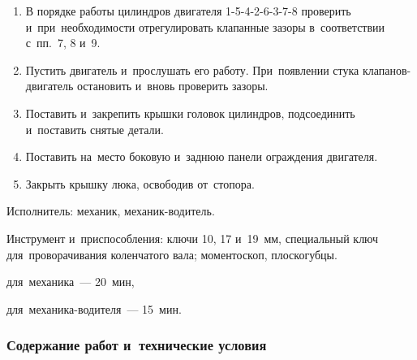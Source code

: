 \begin{enumerate}
    \textit{Примечания:} 
    \begin{itemize}
        \item \textit{Щуп толщиной 0,25~мм должен входить в~зазор с~легким нажимом, толщиной 0,3~мм~--- с~усилием.}
        \item \textit{Регулировать на~холодном двигателе по~истечении 30~мин после его остановки.}
    \end{itemize}
    \item В порядке работы цилиндров двигателя 1-5-4-2-6-3-7-8 проверить и~при~необходимости отрегулировать клапанные зазоры в~соответствии с~пп.~7, 8 и~9. 
    \item Пустить двигатель и~прослушать его работу. При~появлении стука клапанов-двигатель остановить и~вновь проверить зазоры. 
    \item Поставить и~закрепить крышки головок цилиндров, подсоединить и~поставить снятые детали. 
    \item Поставить на~место боковую и~заднюю панели ограждения двигателя. 
    \item Закрыть крышку люка, освободив от~стопора. 
\end{enumerate}

\noindent
Исполнитель: механик, механик-водитель. 

\noindent
Инструмент и~приспособления: ключи 10, 17 и~19~мм, специальный ключ для~проворачивания коленчатого вала; моментоскоп, плоскогубцы. 

\begin{standarttime}
    \item для~механика~--- 20~мин,
    \item для~механика-водителя~--- 15~мин.
\end{standarttime}

\subsubsection{Содержание работ и~технические условия}

